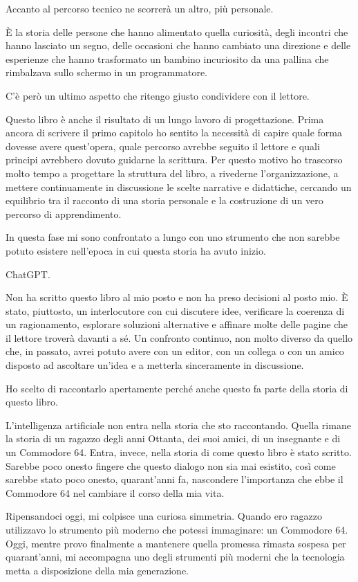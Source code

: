 \documentclass{article}
\begin{document}
Accanto al percorso tecnico ne scorrerà un altro, più personale.

È la storia delle persone che hanno alimentato quella curiosità, degli incontri che hanno lasciato un segno, delle
occasioni che hanno cambiato una direzione e delle esperienze che hanno trasformato un bambino incuriosito da una
pallina che rimbalzava sullo schermo in un programmatore.

C'è però un ultimo aspetto che ritengo giusto condividere con il lettore.

Questo libro è anche il risultato di un lungo lavoro di progettazione. Prima ancora di scrivere il primo capitolo ho
sentito la necessità di capire quale forma dovesse avere quest'opera, quale percorso avrebbe seguito il lettore e quali
principi avrebbero dovuto guidarne la scrittura. Per questo motivo ho trascorso molto tempo a progettare la struttura
del libro, a rivederne l'organizzazione, a mettere continuamente in discussione le scelte narrative e didattiche,
cercando un equilibrio tra il racconto di una storia personale e la costruzione di un vero percorso di apprendimento.

In questa fase mi sono confrontato a lungo con uno strumento che non sarebbe potuto esistere nell'epoca in cui questa
storia ha avuto inizio.

ChatGPT.

Non ha scritto questo libro al mio posto e non ha preso decisioni al posto mio. È stato, piuttosto, un interlocutore con
cui discutere idee, verificare la coerenza di un ragionamento, esplorare soluzioni alternative e affinare molte delle
pagine che il lettore troverà davanti a sé. Un confronto continuo, non molto diverso da quello che, in passato, avrei
potuto avere con un editor, con un collega o con un amico disposto ad ascoltare un'idea e a metterla sinceramente in
discussione.

Ho scelto di raccontarlo apertamente perché anche questo fa parte della storia di questo libro.

L'intelligenza artificiale non entra nella storia che sto raccontando. Quella rimane la storia di un ragazzo degli anni
Ottanta, dei suoi amici, di un insegnante e di un Commodore 64. Entra, invece, nella storia di come questo libro è
stato scritto. Sarebbe poco onesto fingere che questo dialogo non sia mai esistito, così come sarebbe stato poco
onesto, quarant'anni fa, nascondere l'importanza che ebbe il Commodore 64 nel cambiare il corso della mia vita.

Ripensandoci oggi, mi colpisce una curiosa simmetria. Quando ero ragazzo utilizzavo lo strumento più moderno che potessi
immaginare: un Commodore 64. Oggi, mentre provo finalmente a mantenere quella promessa rimasta sospesa per
quarant'anni, mi accompagna uno degli strumenti più moderni che la tecnologia metta a disposizione della mia
generazione.
\end{document}
